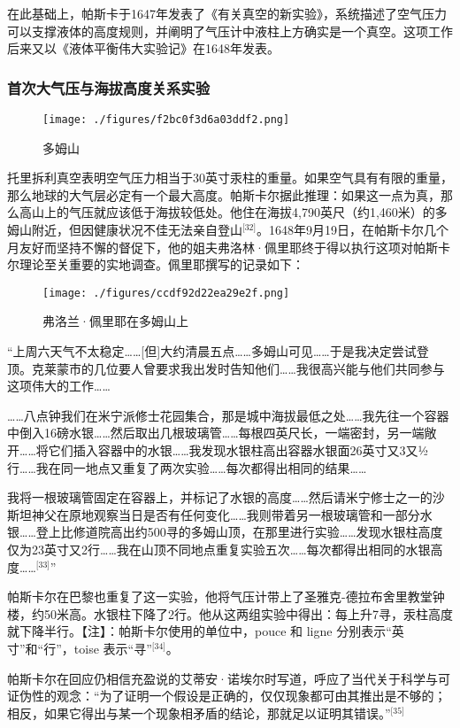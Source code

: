 在此基础上，帕斯卡于1647年发表了《有关真空的新实验》，系统描述了空气压力可以支撑液体的高度规则，并阐明了气压计中液柱上方确实是一个真空。这项工作后来又以《液体平衡伟大实验记》在1648年发表。
\subsubsection{首次大气压与海拔高度关系实验}
\begin{figure}[ht]
\centering
\texttt{[image: ./figures/f2bc0f3d6a03ddf2.png]}
\caption{多姆山} \label{fig_BLSpsk_8}
\end{figure}
托里拆利真空表明空气压力相当于30英寸汞柱的重量。如果空气具有有限的重量，那么地球的大气层必定有一个最大高度。帕斯卡尔据此推理：如果这一点为真，那么高山上的气压就应该低于海拔较低处。他住在海拔4,790英尺（约1,460米）的多姆山附近，但因健康状况不佳无法亲自登山\(^\text{[32]}\)。1648年9月19日，在帕斯卡尔几个月友好而坚持不懈的督促下，他的姐夫弗洛林·佩里耶终于得以执行这项对帕斯卡尔理论至关重要的实地调查。佩里耶撰写的记录如下：
\begin{figure}[ht]
\centering
\texttt{[image: ./figures/ccdf92d22ea29e2f.png]}
\caption{弗洛兰·佩里耶在多姆山上} \label{fig_BLSpsk_9}
\end{figure}
“上周六天气不太稳定……[但]大约清晨五点……多姆山可见……于是我决定尝试登顶。克莱蒙市的几位要人曾要求我出发时告知他们……我很高兴能与他们共同参与这项伟大的工作……

……八点钟我们在米宁派修士花园集合，那是城中海拔最低之处……我先往一个容器中倒入16磅水银……然后取出几根玻璃管……每根四英尺长，一端密封，另一端敞开……将它们插入容器中的水银……我发现水银柱高出容器水银面26英寸又3又½行……我在同一地点又重复了两次实验……每次都得出相同的结果……

我将一根玻璃管固定在容器上，并标记了水银的高度……然后请米宁修士之一的沙斯坦神父在原地观察当日是否有任何变化……我则带着另一根玻璃管和一部分水银……登上比修道院高出约500寻的多姆山顶，在那里进行实验……发现水银柱高度仅为23英寸又2行……我在山顶不同地点重复实验五次……每次都得出相同的水银高度……\(^\text{[33]}\)”

帕斯卡尔在巴黎也重复了这一实验，他将气压计带上了圣雅克-德拉布舍里教堂钟楼，约50米高。水银柱下降了2行。他从这两组实验中得出：每上升7寻，汞柱高度就下降半行。【注】：帕斯卡尔使用的单位中，pouce 和 ligne 分别表示“英寸”和“行”，toise 表示“寻”\(^\text{[34]}\)。

帕斯卡尔在回应仍相信充盈说的艾蒂安·诺埃尔时写道，呼应了当代关于科学与可证伪性的观念：“为了证明一个假设是正确的，仅仅现象都可由其推出是不够的；相反，如果它得出与某一个现象相矛盾的结论，那就足以证明其错误。”\(^\text{[35]}\)

